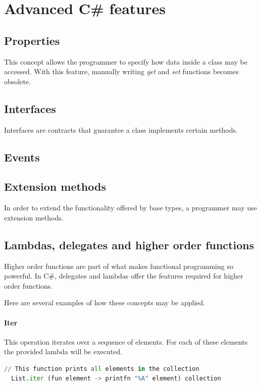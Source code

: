 \documentclass{article}
\begin{document}
\newpage



\iffalse



\section{Advanced C\# features}
\subsection{Properties}
This concept allows the programmer to specify how data inside a class may be accessed.
With this feature, manually writing {\em get} and {\em set} functions becomes obsolete.

\subsection{Interfaces}
Interfaces are contracts that guarantee a class implements certain methods.

\subsection{Events}


\subsection{Extension methods}
In order to extend the functionality offered by base types, a programmer may use extension methods.

\subsection{Lambdas, delegates and higher order functions}
Higher order functions are part of what makes functional programming so powerful.
In C\#, delegates and lambdas offer the features required for higher order functions.

Here are several examples of how these concepts may be applied.

\paragraph{Iter}
This operation iterates over a sequence of elements. For each of these elements the provided lambda will be executed.

\begin{lstlisting}[language=Python]
  // This function prints all elements in the collection
  List.iter (fun element -> printfn "%A" element) collection
\end{lstlisting}
\end{document}
